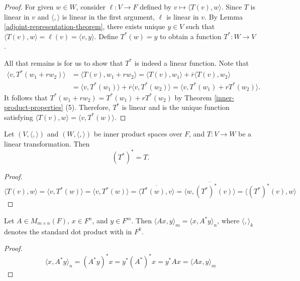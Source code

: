 \begin{proof}
    For given $w \in W$, consider $\ell: V \to F$ defined by $v \mapsto \langle T(v), w \rangle$. Since $T$ is linear in $v$ and $\langle,\rangle$ is linear in the first argument, $\ell$ is linear in $v$. By Lemma \ref{adjoint-representation-theorem}, there exists unique $y \in V$ such that $\langle T(v), w \rangle = \ell(v) = \langle v, y \rangle$. Define $T^*(w) = y$ to obtain a function $T^*: W \to V$.

    All that remains is for us to show that $T^*$ is indeed a linear function. Note that
    \begin{align*}
        \langle v, T^*(w_1 + rw_2) \rangle &= \langle T(v), w_1 + rw_2 \rangle = \langle T(v), w_1 \rangle + \overline{r}\langle T(v), w_2 \rangle \\
        &= \langle v, T^*(w_1) \rangle + \overline{r}\langle v, T^*(w_2) \rangle = \langle v, T^*(w_1) + rT^*(w_2) \rangle.
    \end{align*}
    It follows that $T^*(w_1 + rw_2) = T^*(w_1) + rT^*(w_2)$ by Theorem \ref{inner-product-properties} (5). Therefore, $T^*$ is linear and is the unique function satisfying $\langle T(v), w \rangle = \langle v, T^*(w) \rangle$.
\end{proof}

\begin{prop}
    Let $(V, \langle, \rangle)$ and $(W, \langle, \rangle)$ be inner product spaces over $F$, and $T: V \to W$ be a linear transformation. Then
    \[(T^*)^* = T.\]
\end{prop}

\begin{proof}
    \[\langle T(v), w \rangle = \langle v, T^*(w) \rangle = \langle v, T^*(w) \rangle = \overline{\langle T^*(w), v \rangle} = \overline{\langle w, (T^*)^*(v) \rangle} = \langle (T^*)^*(v), w \rangle\]
\end{proof}

\begin{lemma}
    Let $A \in M_{m \times n}(F)$, $x \in F^n$, and $y \in F^m$. Then $\langle Ax, y \rangle_m = \langle x, A^{*}y \rangle_n$, where $\langle,\rangle_k$ denotes the standard dot product with in $F^k$.
\end{lemma}

\begin{proof}
    \[\langle x, A^{*}y\rangle_n = (A^{*}y)^{*}x = y^{*}(A^*)^{*}x = y^*Ax = \langle Ax, y \rangle_m\]
\end{proof}

